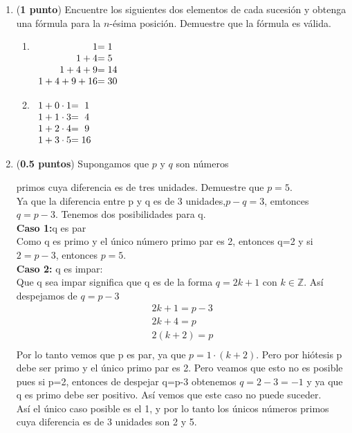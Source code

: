 \documentclass[fontsize=12pt]{scrartcl}
\begin{document}
\begin{enumerate}
		\item ({\bf 1 punto}) Encuentre los siguientes dos elementos de 
		cada sucesi\'on y obtenga una f\'ormula para la $n$-\'esima 
		posici\'on. Demuestre que la f\'ormula es v\'alida.
			\begin{enumerate}
			\item $\begin{array}[t]{r@{}l}
				1 			&= 	1	\\
				1 + 4 		&= 	5	\\
				1 + 4 + 9 		&= 	14	\\
				1 + 4 + 9 + 16 	&= 	30
			\end{array}$
			\item $\begin{array}[t]{r@{}l}
				1 + 0 \cdot 1 	&= 	\ 1 	\\
				1 + 1 \cdot 3 	&= 	\ 4 	\\
				1 + 2 \cdot 4 	&= 	\ 9 	\\
				1 + 3 \cdot 5 	&= 	16
			\end{array}$
			\end{enumerate}

		      \item ({\bf 0.5 puntos}) Supongamos que $p$ y $q$ son n\'umeros
                        
		        primos cuya diferencia es de tres unidades. Demuestre que $p = 5$. \\
                        Ya que la diferencia entre p y q es de 3 unidades,$p-q=3$, emtonces $q=p-3$. Tenemos dos posibilidades para q.
                        \\
                        \textbf{Caso 1:}q es par\\
                        Como q es primo y el único número primo par es 2, entonces q=2 y si  $2=p-3$, entonces $p=5$.\\
                        \textbf{Caso 2:} q es impar: \\
                        Que q sea impar significa que q es de la forma $q=2k+1$ con $k \in \mathbb{Z}$. Así despejamos de $q=p-3$
                        \begin{equation*}
                  \begin{split}
                    2k+1 = p-3\\
                    2k +4 = p\\
                    2(k+2) =p \\
                  \end{split}
                   \end{equation*}
                        Por lo tanto vemos que p es par, ya que $p=1 \cdot (k+2)$. Pero por hiótesis p debe ser primo y el único primo par es 2. Pero veamos que esto no es posible pues si p=2, entonces  de despejar q=p-3 obtenemos $q=2-3=-1$ y ya que q es primo debe ser positivo. Así vemos que este caso no puede suceder.\\
                        Así el único caso posible es el 1, y por lo tanto los únicos números primos cuya diferencia es de 3 unidades son 2 y 5.
                        

\end{enumerate}
\end{document}
